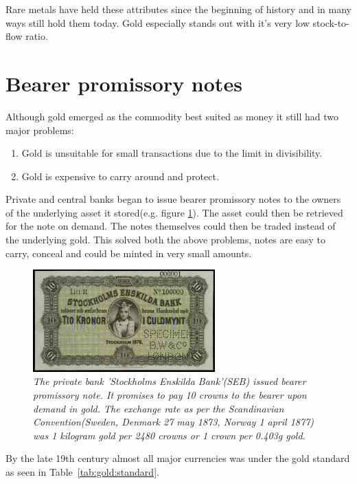 Rare metals have held these attributes since the beginning of history and in many ways still hold them today. Gold especially stands out with it's very low stock-to-flow ratio.

\section{Bearer promissory notes}

Although gold emerged as the commodity best suited as money it still had two major problems:

\begin{enumerate}
	\item Gold is unsuitable for small transactions due to the limit in divisibility.
	\item Gold is expensive to carry around and protect.
\end{enumerate}

Private and central banks began to issue bearer promissory notes to the owners of the underlying asset it stored(e.g. figure \ref{fig:seb:promissory:note}). 
The asset could then be retrieved for the note on demand. The notes themselves could then be traded instead of the underlying gold. This solved both the above problems, notes are easy to carry, conceal and could be minted in very small amounts. 

\begin{figure}[!htb]

	\centering
	\includegraphics[width=7cm]{external/PrivateBankNoteStockholmEnskildaBank1876.JPG}
	\caption{\textit{The private bank 'Stockholms Enskilda Bank'(SEB) issued bearer
	promissory note. It promises to pay 10 crowns to the bearer upon demand in gold. 
	The exchange rate as per the Scandinavian Convention(Sweden, Denmark 27 may 1873, Norway 1 april 1877)\cite{nordic:crown}
	was 1 kilogram gold per 2480 crowns or 1 crown per 0.403g gold\cite{crown:gold}. 
 }}
	\label{fig:seb:promissory:note}
\end{figure}

By the late 19th century almost all major currencies was under the gold standard as seen in Table~\ref{tab:gold:standard}.

